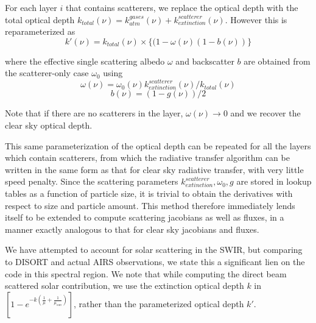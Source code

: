 \documentclass[11pt]{article}
\begin{document}
For each layer $i$ that contains scatterers, we replace the optical depth with
the total optical depth
   $k_{total}(\nu) = k_{atm}^{gases}(\nu) + k^{scatterer}_{extinction}(\nu)$.
However this is reparameterized as
\[
k\prime(\nu) = k_{total}(\nu) \times \{ (1-\omega(\nu) (1-b(\nu)) \}
\]

where the effective single scattering albedo $\omega$ and backscatter $b$ are
obtained from the scatterer-only case $\omega_{0}$ using
\[
\omega(\nu) = \omega_{0}(\nu) k^{scatterer}_{extinction}(\nu)/k_{total}(\nu)
\]
\[
b(\nu)      = (1 - g(\nu))/2
\]

Note that if there are no scatterers in the layer, $\omega(\nu) \rightarrow 0$ and
we recover the clear sky optical depth. 

This same parameterization of the optical depth can be repeated for all the
layers which contain scatterers, from which the radiative transfer algorithm
can be written in the same form as that for clear sky radiative transfer, with
very little speed penalty. Since
the scattering parameters $k^{scatterer}_{extinction},\omega_{0},g$ are stored
in lookup
tables as a function of particle size, it is trivial to obtain the derivatives
with respect to size and particle amount. This method therefore immediately
lends itself to be extended to compute scattering jacobians as well as fluxes,
in a manner exactly analogous to that for clear sky jacobians and fluxes.

We have attempted to account for solar scattering in the SWIR, but comparing to 
DISORT and actual AIRS observations, we state this a significant lien on the code
in this spectral region.
We note that while computing the direct beam scattered solar contribution, we
use the extinction optical depth $k$ in
  $ \left[ 1 - e^{-k (\frac{1}{\mu} + \frac{1}{\mu_{sun}})} \right]$, rather
than the parameterized optical depth $k \prime$.
\end{document}
